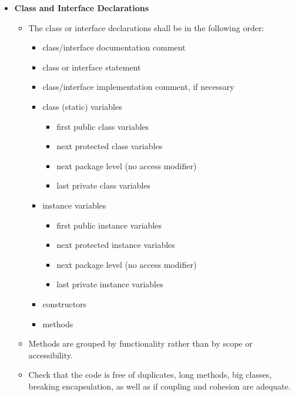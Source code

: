 \documentclass[\mainpath/main]{subfiles}
\begin{document}
\begin{itemize}
		\item \textbf{Class and Interface Declarations}
		\begin{itemize}
			\item The class or interface declarations shall be in the following order:
			\begin{itemize}
				\item class/interface documentation comment
				\item class or interface statement
				\item class/interface implementation comment, if necessary
				\item class (static) variables
				\begin{itemize}
					\item first public class variables
					\item next protected class variables
					\item next package level (no access modifier)
					\item last private class variables
				\end{itemize}
				\item instance variables
				\begin{itemize}
					\item first public instance variables
					\item next protected instance variables
					\item next package level (no access modifier)
					\item last private instance variables
				\end{itemize}
				\item constructors
				\item methods
		  \end{itemize}	
		  
		  \item Methods are grouped by functionality rather than by scope or
          accessibility.
		  \item Check that the code is free of duplicates, long methods, big classes,
           breaking encapsulation, as well as if coupling and cohesion are adequate.			
	   \end{itemize}
	   

\end{itemize}
\end{document}
